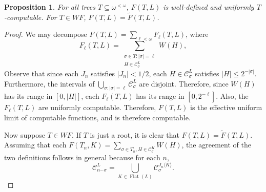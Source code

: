 \documentclass[12pt]{amsart}
\newtheorem{prop}[theorem]{Proposition}
\newcommand{\C}{\mathcal C}
\renewcommand{\flat}{\operatorname{Flat}}
\newcommand{\august}[1]{#1}%
\begin{document}
\begin{prop} For all 
trees $T\subseteq \omega^{<\omega}$,
 $F(T,L)$ is well-defined and 
uniformly $T$-computable.
For $T \in WF$, $F(T,L) = \tilde F(T,L)$.
\end{prop}
\begin{proof}
We may decompose $F(T,L) = \sum_{\ell < \omega} F_\ell(T,L)$, where
$$F_\ell(T,L) = \sum_{\substack{\sigma \in T : |\sigma| = \ell \\ H \in \C_\sigma^L}} W(H),$$
Observe that since each $J_n$ satisfies $|J_n|<1/2$, each $H \in \C_{\sigma}^L$ 
satisfies \august{$|H| \leq 2^{-|\sigma|}$}.  Furthermore, the intervals of 
$\bigcup_{\sigma : |\sigma| = \ell} \C_\sigma^L$ 
are disjoint.  Therefore, since $W(H)$ has its range in $[0,|H|]$, 
each $F_\ell(T,L)$ has its range in $[0,2^{-\ell}]$.  Also, the $F_\ell(T,L)$ 
are uniformly computable.  Therefore, $F(T,L)$ is the effective uniform 
limit of computable functions, and is therefore computable.  

Now suppose $T \in WF$.  If $T$ is just a root,
it is clear that $F(T,L)= \tilde F(T,L)$.  Assuming that each 
$F(T_n,K) = \sum_{\sigma \in T_n, H \in \C_\sigma^K} W(H)$, the agreement 
of the two definitions follows in general because for each $n$, 
$$\C_{n^\smallfrown \sigma}^L = \bigcup_{K \in \flat(L)} \C_\sigma^{J_n\langle K\rangle}.$$
\end{proof}
\end{document}
